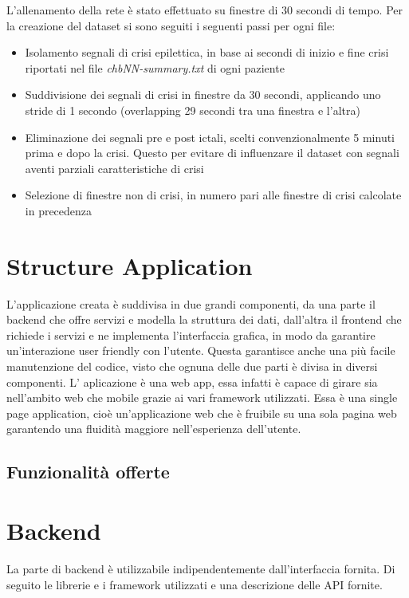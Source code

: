 \documentclass{article}
\begin{document}
L'allenamento della rete è stato effettuato su finestre di 30 secondi di tempo. Per la creazione del dataset si sono seguiti i seguenti passi per ogni file:
\begin{itemize}
\item Isolamento segnali di crisi epilettica, in base ai secondi di inizio e fine crisi riportati nel file \textit{chbNN-summary.txt} di ogni paziente
\item Suddivisione dei segnali di crisi in finestre da 30 secondi, applicando uno stride di 1 secondo (overlapping 29 secondi tra una finestra e l'altra)
\item Eliminazione dei segnali pre e post ictali, scelti convenzionalmente 5 minuti prima e dopo la crisi. Questo per evitare di influenzare il dataset con segnali aventi parziali caratteristiche di crisi
\item Selezione di finestre non di crisi, in numero pari alle finestre di crisi calcolate in precedenza
\end{itemize}
\section{Structure Application}
L'applicazione creata è suddivisa in due grandi componenti, da una parte il backend che offre servizi e modella la struttura dei dati, dall'altra il frontend che richiede i servizi e ne implementa l'interfaccia grafica, in modo da garantire un'interazione user friendly con l'utente.
Questa garantisce anche una più facile manutenzione del codice, visto che ognuna delle due parti è divisa in diversi componenti.
L' aplicazione è una web app, essa infatti è capace di girare sia nell'ambito web che mobile grazie ai vari framework utilizzati.
Essa è una single page application, cioè un'applicazione web che è fruibile su una sola pagina web garantendo una fluidità maggiore nell'esperienza dell'utente.
\subsection{Funzionalità offerte}
\section{Backend}
La parte di backend è utilizzabile indipendentemente dall'interfaccia fornita. Di seguito le librerie e i framework utilizzati e una descrizione delle API fornite. 
\end{document}
